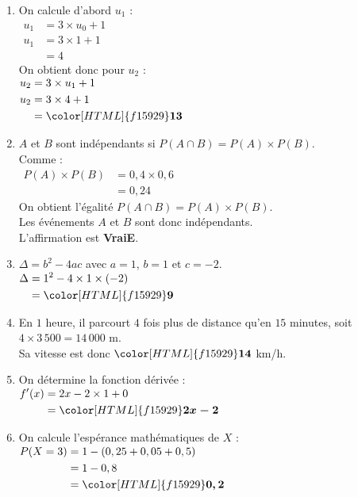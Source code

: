 \documentclass[a4paper,11pt,landscape,exos]{nsi} %
\begin{document}
\begin{multicols}{2}
\begin{enumerate}[]
\item On calcule d'abord $u_1$ : \\   
      $\begin{aligned}
      u_1&=3\times u_0 +1\\
      u_1&=3\times 1 +1\\
      &=4     
      \end{aligned}$\\
      On obtient donc pour $u_2$ :\\
      $\begin{aligned}
      u_2&=3\times u_1 +1\\
      u_2&=3\times 4 +1\\
      &={\color[HTML]{f15929}\boldsymbol{13}}     
      \end{aligned}$
\item $A$ et $B$ sont indépendants si $P(A\cap B)=P(A)\times P(B)$.\\
    Comme :\\$\begin{aligned}
    P(A)\times P(B)&=0{,}4\times 0{,}6\\
    &=0{,}24
    \end{aligned}$\\On obtient l'égalité  $P(A\cap B)=P(A)\times P(B)$.\\
    Les événements $A$ et $B$ sont donc indépendants.\\ L'affirmation est {\bfseries \color[HTML]{f15929}VraiE}.
\item  $\Delta=b^2-4ac$ avec $a=1$, $b=1$ et $c=-2$.\\
      $\begin{aligned}
      \Delta&=1^2-4\times 1\times (-2) \\
      &={\color[HTML]{f15929}\boldsymbol{9}} 
      \end{aligned}$
\item En $1$ heure, il parcourt $4$ fois plus de distance  qu'en $15$ minutes, soit $4\times 3\,500=
      14\,000$ m.\\
      Sa vitesse est donc ${\color[HTML]{f15929}\boldsymbol{14}}$ km/h.
\item  On détermine la fonction dérivée :\\
      $\begin{aligned}
      f'(x)&= 2x -2\times 1 +0\\
      &={\color[HTML]{f15929}\boldsymbol{2x-2}}     
      \end{aligned}$
\item  On calcule l'espérance mathématiques de $X$ : \\
    $\begin{aligned}
      P(X=3) &=1-(0,25+0,05+0,5)\\
      &=1-0,8\\
      &={\color[HTML]{f15929}\boldsymbol{0,2}}
      \end{aligned}$
      

\end{enumerate}
\end{multicols}
\end{document}
